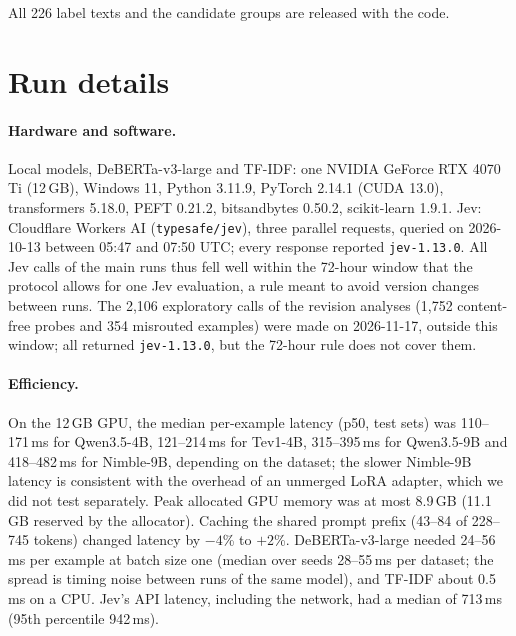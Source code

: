 All 226 label texts and the candidate groups are released with the code.

\FloatBarrier
\section{Run details}
\label{app:runs}

\paragraph{Hardware and software.} Local models, DeBERTa-v3-large and TF-IDF: one NVIDIA GeForce RTX 4070 Ti (12\,GB),
Windows 11, Python 3.11.9, PyTorch 2.14.1 (CUDA 13.0), transformers 5.18.0, PEFT 0.21.2, bitsandbytes 0.50.2,
scikit-learn 1.9.1. Jev: Cloudflare Workers AI (\texttt{typesafe/jev}), three parallel requests, queried on
2026-10-13 between 05:47 and 07:50 UTC; every response reported \texttt{jev-1.13.0}. All Jev calls of the main runs
thus fell well within the 72-hour window that the protocol allows for one Jev evaluation, a rule meant to avoid
version changes between runs. The 2{,}106 exploratory calls of the revision analyses (1{,}752 content-free probes and
354 misrouted examples) were made on 2026-11-17, outside this window; all returned \texttt{jev-1.13.0}, but the
72-hour rule does not cover them.

\paragraph{Efficiency.}
\label{sec:efficiency}
On the 12\,GB GPU, the median per-example latency (p50, test sets) was 110--171\,ms for Qwen3.5-4B, 121--214\,ms for
Tev1-4B, 315--395\,ms for Qwen3.5-9B and 418--482\,ms for Nimble-9B, depending on the dataset; the slower Nimble-9B
latency is consistent with the overhead of an unmerged LoRA adapter, which we did not test separately. Peak allocated
GPU memory was at most 8.9\,GB (11.1\,GB reserved by the allocator). Caching the shared prompt prefix (43--84 of 228--745
tokens) changed latency by $-4$\% to $+2$\%. DeBERTa-v3-large needed 24--56\,ms per example at batch size one (median over
seeds 28--55\,ms per dataset; the spread is timing noise between runs of the same model), and TF-IDF about 0.5\,ms on a
CPU. Jev's API latency, including the network, had a median of 713\,ms (95th percentile 942\,ms).

